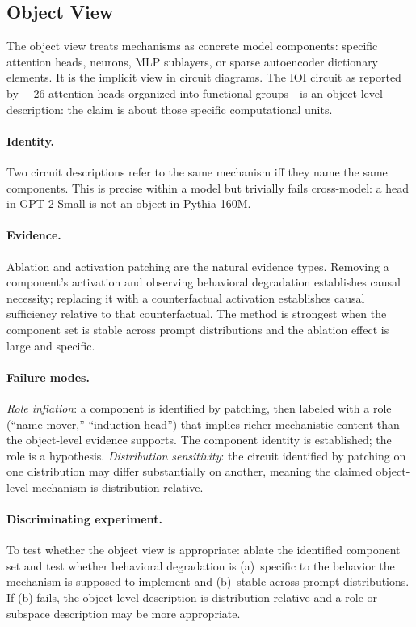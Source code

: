 \documentclass[11pt]{article}
\theoremstyle{remark}
\begin{document}
\subsection{Object View}

The object view treats mechanisms as concrete model components: specific
attention heads, neurons, MLP sublayers, or sparse autoencoder dictionary
elements.  It is the implicit view in circuit diagrams.  The IOI circuit
as reported by \citet{wang2022}---26 attention heads organized into
functional groups---is an object-level description: the claim is about
those specific computational units.

\paragraph{Identity.}
Two circuit descriptions refer to the same mechanism iff they name the
same components.  This is precise within a model but trivially fails
cross-model: a head in GPT-2 Small is not an object in Pythia-160M.

\paragraph{Evidence.}
Ablation and activation patching are the natural evidence types.  Removing
a component's activation and observing behavioral degradation establishes
causal necessity; replacing it with a counterfactual activation establishes
causal sufficiency relative to that counterfactual.  The method is
strongest when the component set is stable across prompt distributions
and the ablation effect is large and specific.

\paragraph{Failure modes.}
\emph{Role inflation}: a component is identified by patching, then labeled
with a role (``name mover,'' ``induction head'') that implies richer
mechanistic content than the object-level evidence supports.  The component
identity is established; the role is a hypothesis.  \emph{Distribution
sensitivity}: the circuit identified by patching on one distribution may
differ substantially on another, meaning the claimed object-level mechanism
is distribution-relative.

\paragraph{Discriminating experiment.}
To test whether the object view is appropriate: ablate the identified
component set and test whether behavioral degradation is (a)~specific to
the behavior the mechanism is supposed to implement and (b)~stable across
prompt distributions.  If (b) fails, the object-level description is
distribution-relative and a role or subspace description may be more
appropriate.
\end{document}

